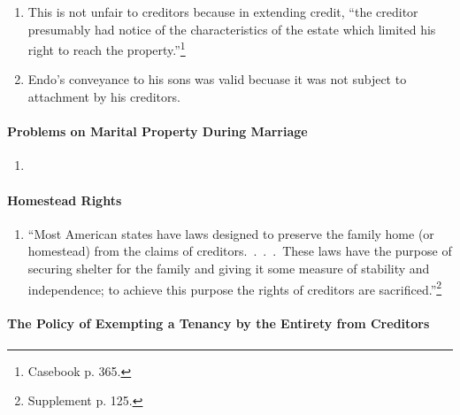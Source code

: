 \begin{enumerate}
    legally unifie. They have a single ownership interest in a tenancy by the 
    entirety. ``Neither husband nor wife has a separate divisible interest in 
    the property held by the entirety that can be conveyed or reached by 
    execution.''\footnote{Casebook p. 364.}
    \item This is not unfair to creditors because in extending credit, ``the 
    creditor presumably had notice of the characteristics of the estate which 
    limited his right to reach the property.''\footnote{Casebook p. 365.}
    \item Endo's conveyance to his sons was valid becuase it was not subject 
    to attachment by his creditors.
\end{enumerate}

\paragraph{Problems on Marital Property During Marriage}

\begin{enumerate}
    \item %
\end{enumerate}

\paragraph{Homestead Rights}

\begin{enumerate}
    \item ``Most American states have laws designed to preserve the family 
    home (or homestead) from the claims of creditors.~.~.~.~These laws have 
    the purpose of securing shelter for the family and giving it some measure 
    of stability and independence; to achieve this purpose the rights of 
    creditors are sacrificed.''\footnote{Supplement p. 125.}
\end{enumerate}

\paragraph{The Policy of Exempting a Tenancy by the Entirety from Creditors}

